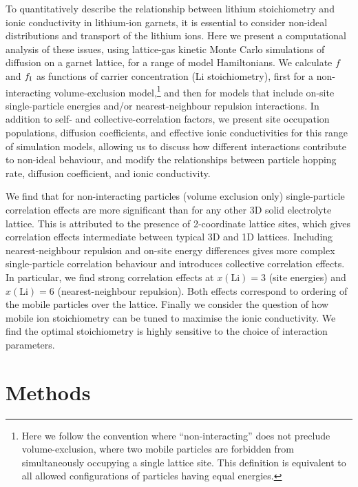 \documentclass[aps,prb,twocolumn,superscriptaddress,reprint]{revtex4-1}
\begin{document}
To quantitatively describe the relationship between lithium stoichiometry and ionic conductivity in lithium-ion garnets, it is essential to consider non-ideal distributions and transport of the lithium ions. 
Here we present a computational analysis of these issues, using lattice-gas kinetic Monte Carlo simulations of diffusion on a garnet lattice, for a range of model Hamiltonians. 
We calculate $f$ and $f_{\mathrm{I}}$ as functions of carrier concentration (Li stoichiometry), first for a non-interacting volume-exclusion model,\footnote{Here we follow the convention where ``non-interacting'' does not preclude volume-exclusion, where two mobile particles are forbidden from simultaneously occupying a single lattice site.\cite{Kutner_PhysLett1981} This definition is equivalent to all allowed configurations of particles having equal energies.} and then for models that include on-site single-particle energies and/or nearest-neighbour repulsion interactions. 
In addition to self- and collective-correlation factors, we present site occupation populations, diffusion coefficients, and effective ionic conductivities for this range of simulation models, allowing us to discuss how different interactions contribute to non-ideal behaviour, and modify the relationships between particle hopping rate, diffusion coefficient, and ionic conductivity. 

We find that for non-interacting particles (volume exclusion only) single-particle correlation effects are more significant than for any other 3D solid electrolyte lattice. This is attributed to the presence of 2-coordinate lattice sites, which gives correlation effects intermediate between typical 3D and 1D lattices. Including nearest-neighbour repulsion and on-site energy differences gives more complex single-particle correlation behaviour and introduces collective correlation effects. In particular, we find strong correlation effects at $x(\mathrm{Li})=3$ (site energies) and $x(\mathrm{Li})=6$ (nearest-neighbour repulsion). Both effects correspond to ordering of the mobile particles over the lattice. Finally we consider the question of how mobile ion stoichiometry can be tuned to maximise the ionic conductivity. We find the optimal stoichiometry is highly sensitive to the choice of interaction parameters.


\section{Methods}
\end{document}
